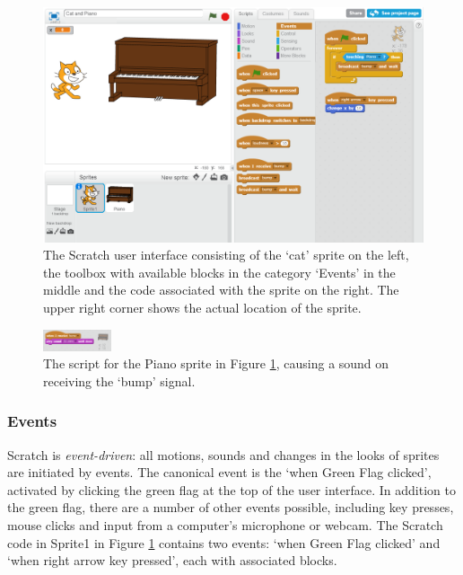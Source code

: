 \documentclass{sig-alternate}
\begin{document}
\begin{figure}
	\begin{center}
		\includegraphics[width=\columnwidth]{fig/ui.png}
		\caption{The Scratch user interface consisting of the `cat' sprite on the left, the toolbox with available blocks in the category `Events' in the middle and the code associated with the sprite on the right. The upper right corner shows the actual location of the sprite.}
		\label{fig:ui}
	\end{center}
\end{figure} 

\begin{figure}
	\begin{center}
		\includegraphics[width=2cm]{fig/bump.png}
		\caption{The script for the Piano sprite in Figure \ref{fig:ui}, causing a sound on receiving the `bump' signal.}
		\label{fig:bump}
	\end{center}
\end{figure} 

\subsubsection{Events}
Scratch is \emph{event-driven}: all motions, sounds and changes in the looks of sprites are initiated by events. The canonical event is the `when Green Flag clicked', activated by clicking the green flag at the top of the user interface. In addition to the green flag, there are a number of other events possible, including key presses, mouse clicks and input from a computer's microphone or webcam. The Scratch code in Sprite1 in Figure \ref{fig:ui} contains two events: `when Green Flag clicked' and `when right arrow key pressed', each with associated blocks.
\end{document}
